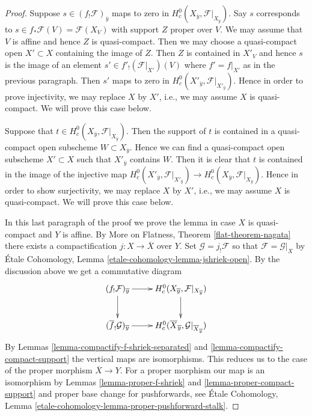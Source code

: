 \documentclass{stacks-project}
\theoremstyle{plain}
\theoremstyle{definition}
\theoremstyle{remark}
\numberwithin{equation}{subsection}
\begin{document}
\begin{proof}
\medskip\noindent
Suppose $s \in (f_!\mathcal{F})_{\overline{y}}$ maps to zero in
$H^0_c(X_{\overline{y}}, \mathcal{F}|_{X_{\overline{y}}})$.
Say $s$ corresponds to $s \in f_*\mathcal{F}(V) = \mathcal{F}(X_V)$
with support $Z$ proper over $V$. We may assume that $V$ is affine
and hence $Z$ is quasi-compact. Then we may choose a quasi-compact open
$X' \subset X$ containing the image of $Z$. Then $Z$ is contained in
$X'_V$ and hence $s$ is the image of an element
$s' \in f'_!(\mathcal{F}|_{X'})(V)$ where $f' = f|_{X'}$ as in
the previous paragraph. Then $s'$ maps to zero in
$H^0_c(X'_{\overline{y}}, \mathcal{F}|_{X'_{\overline{y}}})$.
Hence in order to prove injectivity, we may replace $X$ by
$X'$, i.e., we may assume $X$ is quasi-compact. We will prove
this case below.

\medskip\noindent
Suppose that
$t \in H^0_c(X_{\overline{y}}, \mathcal{F}|_{X_{\overline{y}}})$.
Then the support of $t$ is contained in a quasi-compact
open subscheme $W \subset X_{\overline{y}}$.
Hence we can find a quasi-compact open subscheme
$X' \subset X$ such that $X'_{\overline{y}}$ contains $W$.
Then it is clear that $t$ is contained in the image
of the injective map
$H^0_c(X'_{\overline{y}}, \mathcal{F}|_{X'_{\overline{y}}}) \to
H^0_c(X_{\overline{y}}, \mathcal{F}|_{X_{\overline{y}}})$.
Hence in order to show surjectivity, we may replace $X$
by $X'$, i.e., we may assume $X$ is quasi-compact.
We will prove this case below.

\medskip\noindent
In this last paragraph of the proof we prove the lemma in case
$X$ is quasi-compact and $Y$ is affine. By More on Flatness, Theorem
\ref{flat-theorem-nagata} there exists a compactification
$j : X \to \overline{X}$ over $Y$. Set $\mathcal{G} = j_!\mathcal{F}$
so that $\mathcal{F} = \mathcal{G}|_X$ by
\'Etale Cohomology, Lemma \ref{etale-cohomology-lemma-jshriek-open}.
By the discussion above we get a commutative diagram
$$
\xymatrix{
(f_!\mathcal{F})_{\overline{y}} \ar[r] \ar[d] &
H^0_c(X_{\overline{y}}, \mathcal{F}|_{X_{\overline{y}}}) \ar[d] \\
(\overline{f}_!\mathcal{G})_{\overline{y}} \ar[r] &
H^0_c(\overline{X}_{\overline{y}}, \mathcal{G}|_{\overline{X}_{\overline{y}}})
}
$$
By Lemmas \ref{lemma-compactify-f-shriek-separated} and
\ref{lemma-compactify-compact-support} the vertical maps
are isomorphisms. This reduces us to the case of the proper
morphism $\overline{X} \to Y$. For a proper morphism our map
is an isomorphism by
Lemmas \ref{lemma-proper-f-shriek} and \ref{lemma-proper-compact-support}
and proper base change for pushforwards, see
\'Etale Cohomology, Lemma
\ref{etale-cohomology-lemma-proper-pushforward-stalk}.
\end{proof}
\end{document}
